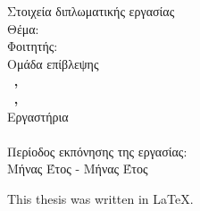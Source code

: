 \pagestyle{empty}
\hspace{10pt}
\begin{center}
\Large{Στοιχεία διπλωματικής εργασίας}\\[1cm]
{\large Θέμα:}
\textbf{\large \doctitle}\\[1cm]
\large {Φοιτητής: \textbf{\nomme}\\[1cm]
\large{Ομάδα επίβλεψης}\\
\textbf{\suptitle \, \supname , \supuni}\\[1cm]
\textbf{\cosuptitle \, \cosupname , \cosupuni} \\[1cm]
Εργαστήρια\\
\lab \\[1cm]
Περίοδος εκπόνησης της εργασίας:\\ Μήνας Έτος - Μήνας Έτος\\[1cm]}
\end{center}

\vspace{5em}

\begin{center}
  { \large
    This thesis was written in \LaTeX.\\
  }
\end{center}
